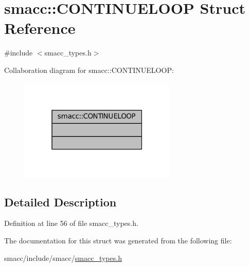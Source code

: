 \hypertarget{structsmacc_1_1CONTINUELOOP}{}\section{smacc\+:\+:C\+O\+N\+T\+I\+N\+U\+E\+L\+O\+OP Struct Reference}
\label{structsmacc_1_1CONTINUELOOP}


{\ttfamily \#include $<$smacc\+\_\+types.\+h$>$}



Collaboration diagram for smacc\+:\+:C\+O\+N\+T\+I\+N\+U\+E\+L\+O\+OP\+:
\nopagebreak
\begin{figure}[H]
\begin{center}
\leavevmode
\includegraphics[width=211pt]{structsmacc_1_1CONTINUELOOP__coll__graph}
\end{center}
\end{figure}


\subsection{Detailed Description}


Definition at line 56 of file smacc\+\_\+types.\+h.



The documentation for this struct was generated from the following file\+:\begin{DoxyCompactItemize}
\item 
smacc/include/smacc/\hyperlink{smacc__types_8h}{smacc\+\_\+types.\+h}\end{DoxyCompactItemize}
